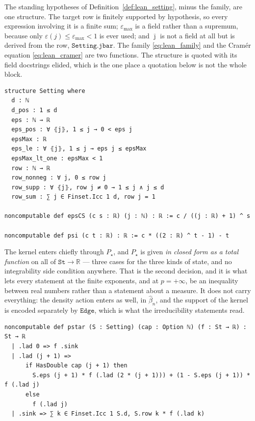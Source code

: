 The standing hypotheses of Definition~\ref{def:lean_setting}, minus the family, are one
structure. The target row is finitely supported by hypothesis, so every expression involving it
is a finite sum; $\varepsilon_{\max}$ is a field rather than a supremum, because only
$\varepsilon(j)\leq\varepsilon_{\max}<1$ is ever used; and $\bar\jmath$ is not a field at all
but is derived from the row, $\texttt{Setting.jbar}$. The family \eqref{eq:lean_family} and the
Cram\'er equation \eqref{eq:lean_cramer} are two functions. The structure is quoted with its
field docstrings elided, which is the one place a quotation below is not the whole block.
\begin{lstlisting}[style=lean]
structure Setting where
  d : ℕ
  d_pos : 1 ≤ d
  eps : ℕ → ℝ
  eps_pos : ∀ ⦃j⦄, 1 ≤ j → 0 < eps j
  epsMax : ℝ
  eps_le : ∀ ⦃j⦄, 1 ≤ j → eps j ≤ epsMax
  epsMax_lt_one : epsMax < 1
  row : ℕ → ℝ
  row_nonneg : ∀ j, 0 ≤ row j
  row_supp : ∀ ⦃j⦄, row j ≠ 0 → 1 ≤ j ∧ j ≤ d
  row_sum : ∑ j ∈ Finset.Icc 1 d, row j = 1

noncomputable def epsCS (c s : ℝ) (j : ℕ) : ℝ := c / ((j : ℝ) + 1) ^ s

noncomputable def psi (c t : ℝ) : ℝ := c * ((2 : ℝ) ^ t - 1) - t
\end{lstlisting}

The kernel enters chiefly through $P_\star$, and $P_\star$ is given \emph{in closed form as a
total function} on all of $\texttt{St}\rightarrow\mathbb R$ --- three cases for the three kinds
of state, and no integrability side condition anywhere. That is the second decision, and it is
what lets every statement at the finite exponents, and at $p=+\infty$, be an inequality between
real numbers rather than a statement about a measure. It does not carry everything: the density
action enters as well, in $\widehat\beta_n$, and the support of the kernel is encoded separately
by $\texttt{Edge}$, which is what the irreducibility statements read.
\begin{lstlisting}[style=lean]
noncomputable def pstar (S : Setting) (cap : Option ℕ) (f : St → ℝ) : St → ℝ
  | .lad 0 => f .sink
  | .lad (j + 1) =>
      if HasDouble cap (j + 1) then
        S.eps (j + 1) * f (.lad (2 * (j + 1))) + (1 - S.eps (j + 1)) * f (.lad j)
      else
        f (.lad j)
  | .sink => ∑ k ∈ Finset.Icc 1 S.d, S.row k * f (.lad k)
\end{lstlisting}

